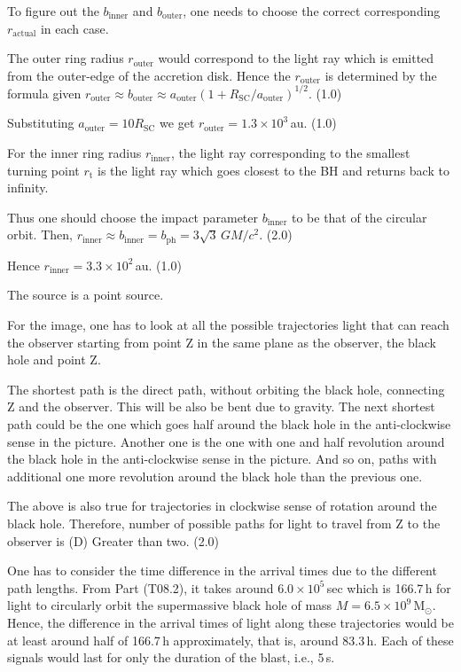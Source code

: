 \begin{description}
  To figure out the $b_{\mathrm{inner}}$ and $b_{\mathrm{outer}}$, one needs to
  choose the correct corresponding $r_{\mathrm{actual}}$ in each case.

  The outer ring radius $r_{\mathrm{outer}}$ would correspond to the light ray
  which is emitted from the outer-edge of the accretion disk. Hence the
  $r_{\mathrm{outer}}$ is determined by the formula given
  $r_{\mathrm{outer}} \approx b_{\mathrm{outer}} \approx a_{\mathrm{outer}}
  \left(1 + R_{\mathrm{SC}}/a_{\mathrm{outer}}\right)^{1/2}$. \hfill(1.0)

  Substituting $a_{\mathrm{outer}} = 10 R_{\mathrm{SC}}$ we get
  $r_{\mathrm{outer}} = 1.3 \times 10^{3}$\,au. \hfill(1.0)

  For the inner ring radius $r_{\mathrm{inner}}$, the light ray corresponding
  to the smallest turning point $r_{\mathrm{t}}$ is the light ray which goes
  closest to the BH and returns back to infinity.

  Thus one should choose the impact parameter $b_{\mathrm{inner}}$ to be that
  of the circular orbit. Then,
  $r_{\mathrm{inner}} \approx b_{\mathrm{inner}} = b_{\mathrm{ph}}
  = 3\sqrt{3}\,GM/c^2$. \hfill(2.0)

  Hence $r_{\mathrm{inner}} = 3.3 \times 10^{2}$\,au. \hfill(1.0)

\item[(T08.5a)] The source is a point source.

  For the image, one has to look at all the possible trajectories light that
  can reach the observer starting from point Z in the same plane as the
  observer, the black hole and point Z.

  The shortest path is the direct path, without orbiting the black hole,
  connecting Z and the observer. This will be also be bent due to gravity. The
  next shortest path could be the one which goes half around the black hole in
  the anti-clockwise sense in the picture. Another one is the one with one and
  half revolution around the black hole in the anti-clockwise sense in the
  picture. And so on, paths with additional one more revolution around the
  black hole than the previous one.

  The above is also true for trajectories in clockwise sense of rotation
  around the black hole. Therefore, number of possible paths for light to
  travel from Z to the observer is (D) Greater than two. \hfill(2.0)

\item[(T08.5b)] One has to consider the time difference in the arrival times
  due to the different path lengths. From Part (T08.2), it takes around
  $6.0 \times 10^{5}$\,sec which is 166.7\,h for light to circularly orbit the
  supermassive black hole of mass $M = 6.5 \times 10^{9}\,\mathrm{M_\odot}$.
  Hence, the difference in the arrival times of light along these trajectories
  would be at least around half of 166.7\,h approximately, that is, around
  83.3\,h. Each of these signals would last for only the duration of the
  blast, i.e., 5\,s.


\end{description}
